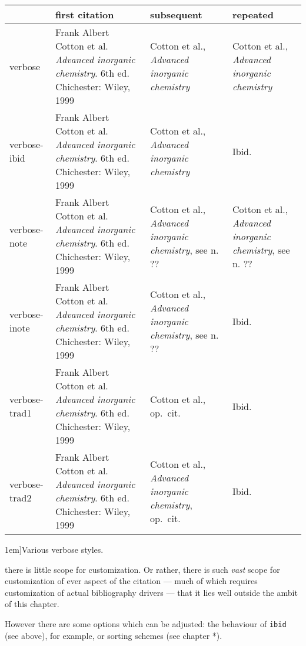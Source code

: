 \begin{table*}[btp]
\small
\begin{tabular}{lp{1.7in}p{1.7in}p{1.7in}}
\toprule
& \textsf{first citation} & \textsf{subsequent} &
\textsf{repeated} \\
\midrule verbose & Frank Albert Cotton et al. \emph{Advanced inorganic
  chemistry}. 6th ed. Chichester: Wiley, 1999 & Cotton et al.,
\emph{Advanced inorganic chemistry} & Cotton et al., \emph{Advanced
  inorganic chemistry}\\
verbose-ibid & Frank Albert Cotton et al. \emph{Advanced inorganic
  chemistry}. 6th ed. Chichester: Wiley, 1999 & Cotton et al.,
\emph{Advanced inorganic chemistry} & Ibid. \\
verbose-note & Frank Albert Cotton et al. \emph{Advanced inorganic
  chemistry}. 6th ed. Chichester: Wiley, 1999 & Cotton et al.,
\emph{Advanced inorganic chemistry}, see n. ?? & Cotton et al.,
\emph{Advanced inorganic chemistry}, see n. ??\\
verbose-inote & Frank Albert Cotton et al. \emph{Advanced inorganic
  chemistry}. 6th ed. Chichester: Wiley, 1999 & Cotton et al.,
\emph{Advanced inorganic chemistry}, see n. ?? & Ibid. \\
verbose-trad1 & Frank Albert Cotton et al. \emph{Advanced inorganic
  chemistry}. 6th ed. Chichester: Wiley, 1999 & Cotton et al.,
op.\ cit. & Ibid. \\
verbose-trad2 & Frank Albert Cotton et al. \emph{Advanced inorganic
  chemistry}. 6th ed. Chichester: Wiley, 1999 & Cotton et al.,
\emph{Advanced inorganic chemistry},
op.\ cit. & Ibid. \\
\bottomrule
\end{tabular}
\caption[][1em]{Various verbose styles.\label{bibliography:examples:verbose}}
\end{table*}

 there is little scope for
customization. Or rather, there is such \emph{vast} scope for
customization of ever aspect of the citation --- much of which
requires customization of actual bibliography drivers --- that it lies
well outside the ambit of this chapter.

However there are some options which can be adjusted: the behaviour of
\verb|ibid| (see above), for example, or sorting schemes (see chapter
*).

